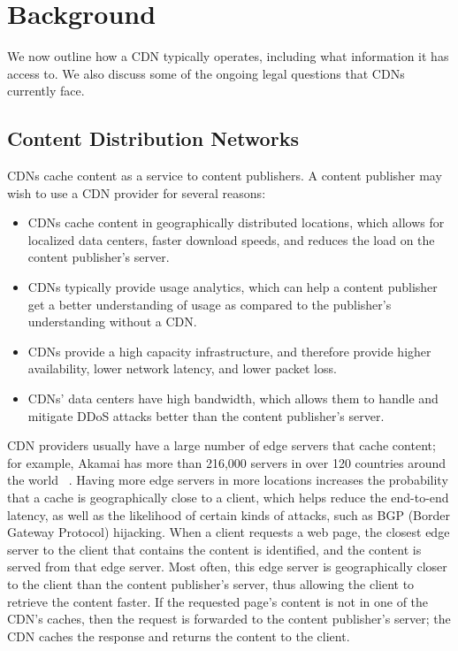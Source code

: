 \section{Background}
\label{sec:background}

We now outline how a CDN typically operates, including what information it
has access to. We also discuss some of the ongoing legal
questions that CDNs currently face.

\subsection{Content Distribution Networks}
CDNs cache content as a service to content publishers.  A 
content publisher may wish to use a CDN provider for several reasons:

\begin{itemize}
\item CDNs cache content in geographically distributed locations, which allows for localized data centers, faster download speeds, and reduces the load on the content publisher's server.
\item CDNs typically provide usage analytics, which can help a content publisher get a better understanding of usage as compared to the publisher's understanding without a CDN.
\item CDNs provide a high capacity infrastructure, and therefore provide higher availability, lower network latency, and lower packet loss.  
\item CDNs' data centers have high bandwidth, which allows them to handle and mitigate DDoS attacks better than the content publisher's server.
\end{itemize}

CDN providers usually have a large number of edge servers that cache content;
for example, Akamai has more than 216,000 servers in over 120 countries around
the world~ \cite{akamai_facts}.  Having more edge servers in more locations
increases the probability that a cache is geographically close to a client,
which helps reduce the end-to-end latency, as well as the likelihood of
certain kinds of attacks, such as BGP (Border Gateway Protocol) hijacking.
When a client requests a web page, the closest edge server to the client that
contains the content is identified, and the content is served from that edge
server.  Most often, this edge server is geographically closer to the client
than the content publisher's server, thus allowing the client to retrieve the
content faster. If the requested page's content is not in one of the CDN's
caches, then the request is forwarded to the content publisher's server; the
CDN caches the response and returns the content to the client.

